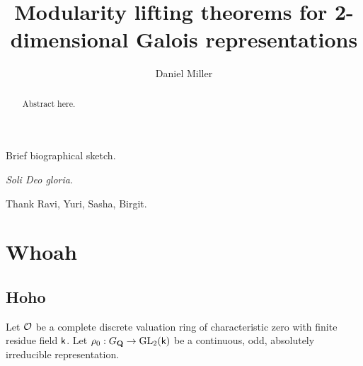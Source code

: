\documentclass[phd,cornellheadings,draft]{cornell}
\title{Modularity lifting theorems for 2-dimensional Galois representations}
\author{Daniel Miller}
\begin{document}
\maketitle
\makecopyright

\begin{abstract}
Abstract here. 
\end{abstract}

\begin{biosketch}
Brief biographical sketch.
\end{biosketch}

\begin{dedication}
\emph{Soli Deo gloria}.
\end{dedication}

\begin{acknowledgements}
Thank Ravi, Yuri, Sasha, Birgit. 
\end{acknowledgements}

\contentspage

\normalspacing
\setcounter{page}{1}
\pagestyle{cornell}







\chapter{Whoah}

\section{Hoho}

Let $\mathcal{O}$ be a complete discrete valuation ring of characteristic zero with 
finite residue field $\mathsf{k}$. Let $\rho_0:G_{\mathbf{Q}}\to \operatorname{GL}_2(\mathsf{k})$ be a continuous, 
odd, absolutely irreducible representation. 
\end{document}
